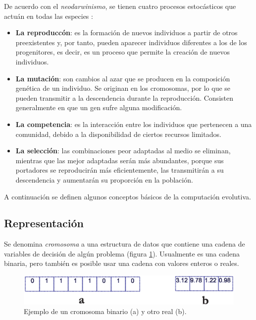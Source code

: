 \begin{itemize}
   De acuerdo con el \textit{neodarwinismo}, se tienen cuatro procesos estoc\'asticos que actu\'an en todas las especies\DIFdelbegin %
\DIFdelend :
   \begin{itemize}
    \item \textbf{La reproducc\'on}: es la formaci\'on de nuevos individuos a partir de otros preexistentes y, por tanto, 
    pueden aparecer individuos diferentes a los de los progenitores, es decir, es un proceso que permite la creaci\'on 
    de nuevos individuos.
    \item \textbf{La mutaci\'on}: son cambios al azar que se producen en la composici\'on gen\'etica de un individuo. Se 
    originan en los cromosomas, por lo que se pueden transmitir a la descendencia durante la reproducci\'on. Consisten 
    generalmente en que un gen sufre alguna modificaci\'on. 
    \item \textbf{La competencia}: es la interacci\'on entre los individuos que pertenecen a una comunidad, debido a la 
    disponibilidad de ciertos recursos limitados.
    \item \textbf{La selecci\'on}: las combinaciones peor adaptadas al medio se eliminan, mientras que las mejor adaptadas 
    ser\'an m\'as abundantes, porque sus portadores se reproducir\'an m\'as eficientemente, las transmitir\'an a su descendencia 
    y aumentar\'an su proporci\'on en la poblaci\'on. 
   \end{itemize}
  \end{itemize}

  A continuaci\'on se definen algunos conceptos b\'asicos de la computaci\'on evolutiva.

  \subsection{Representaci\'on}

  Se denomina \textit{cromosoma} a una estructura de datos que contiene una cadena de variables de decisi\'on de alg\'un 
  problema (figura \ref{fig:cromosoma}). Usualmente es una cadena binaria, pero tambi\'en es posible usar una cadena con 
  valores enteros o reales.

  \begin{figure}[H]
	\centering
	\DIFdelbeginFL %
\DIFdelendFL \DIFaddbeginFL \includegraphics[scale=0.70]{Cap2/1-16.eps}
	  \DIFaddendFL \caption{Ejemplo de un cromosoma binario (a) y otro real (b).}
      \label{fig:cromosoma}
      \end{figure}

